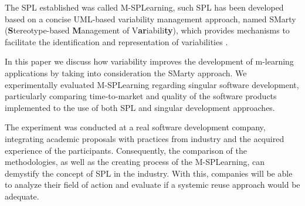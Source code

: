 \begin{comment}
, in order to verify if the adoption of variabilities can result in improvements in the development process of mobile learning applications in relation to the singular (traditional) development.
\end{comment}

The SPL established was called M-SPLear\allowbreak ning, such SPL has been developed based on a concise UML-based variability management approach, named SMarty  (\textbf{S}tereotype-based \textbf{M}anagement of V\textbf{ar}iabili\textbf{ty}), which provides mechanisms to facilitate the identification and representation of variabilities \cite{marcolinospl2017}.

In this paper we discuss how variability improves the development of m-learning applications by taking into consideration the SMarty approach. We experimentally evaluated M-SPLear\allowbreak ning regarding singular software development, particularly comparing time-to-market and quality of the software products implemented to the use of both SPL and singular development approaches. 

\begin{comment}The results have shown a significant reduction in the time-to-market and an improvement in the quality, in terms of number of faults, when considering the software products developed from the M-SPLear\allowbreak ning core assets with the support of variabilities.
\end{comment}

The experiment was conducted at a real software development company, integrating academic proposals with practices from industry and the acquired experience of the participants. Consequently, the comparison of the methodologies, as well as the creating process of the M-SPLear\allowbreak ning, can demystify the concept of SPL in the industry. With this, companies will be able to analyze their field of action and evaluate if a systemic reuse approach would be adequate.


